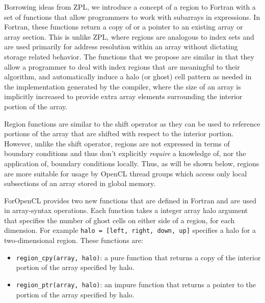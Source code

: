 Borrowing ideas from ZPL, we introduce a concept of a region to Fortran with a
set of functions that allow programmers to work with subarrays in expressions.
In Fortran, these functions return a copy of or a pointer to an existing array or array section.
This is unlike ZPL, where regions are analogous to index sets and are used
primarily for address resolution within an array without dictating storage
related behavior.  The functions that we propose are similar in that they allow
a programmer to deal with index regions that are meaningful to their algorithm,
and automatically induce a halo (or ghost) cell pattern as needed in the
implementation generated by the compiler, where the size of an array is
implicitly increased to provide extra array elements surrounding the interior 
portion of the array.

Region functions are similar to the shift operator as they can be used to
reference portions of the array that are shifted with respect to the interior
portion.  However, unlike the shift operator, regions are not expressed in terms
of boundary conditions and thus don't explicitly \emph{require} a knowledge of,
nor the application of, boundary conditions locally.  Thus, as will be shown
below, regions are more suitable for usage by OpenCL thread groups which access
only local subsections of an array stored in global memory.

ForOpenCL provides two new functions that are defined in Fortran and are used
in array-syntax operations.  Each function takes a integer array halo argument
that specifies the number of ghost cells on either side of a region, for each
dimension.  For example {\tt halo = [left, right, down, up]} specifies a halo
for a two-dimensional region.  These functions are:

\begin{itemize}

\item {\tt region\_cpy(array, halo)}: a pure function that returns a copy of
  the interior portion of the array specified by halo.

\item {\tt region\_ptr(array, halo)}: an impure function that returns a pointer 
  to the portion of the array specified by halo.

\end{itemize}

